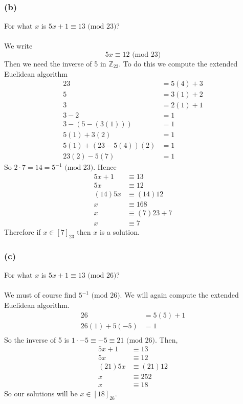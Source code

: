 \documentclass{article}
\begin{document}
\subsubsection*{(b)}
For what $x$ is $5x + 1 \equiv 13 \text{ (mod 23)}$?
\\\\
We write
\[ 5x \equiv 12 \text{ (mod 23)} \]
Then we need the inverse of 5 in $\mathbb{Z}_{23}$.
To do this we compute the extended Euclidean algorithm
\begin{align*}
    23 & = 5 (4)+ 3 \\
    5 & = 3 (1) + 2 \\
    3 & = 2 (1) + 1 \\
    3 - 2 & = 1 \\
    3 - (5 - (3 (1))) & = 1 \\
    5(1) + 3(2) & = 1 \\
    5(1) + (23 - 5(4))(2) & = 1 \\
    23(2) - 5(7) & = 1
\end{align*}
So $2 \cdot 7 = 14 = 5^{-1} \text{ (mod 23)}$.
Hence
\begin{align*}
    5x + 1 & \equiv 13 \\
    5x & \equiv 12 \\
    (14)5x & \equiv (14)12 \\
    x & \equiv 168 \\
    x & \equiv (7)23 + 7 \\
    x & \equiv 7
\end{align*}
Therefore if $x \in [7]_{23}$ then $x$ is a solution.
\subsubsection*{(c)}
For what $x$ is $5x +1 \equiv 13 \text{ (mod 26)}$?
\\\\
We must of course find $5^{-1} \text{ (mod 26)}$.
We will again compute the extended Euclidean algorithm.
\begin{align*}
    26 & = 5(5) + 1 \\
    26(1) + 5(-5) & = 1\\
\end{align*}
So the inverse of 5 is $1 \cdot -5 \equiv -5 \equiv 21 \text{ (mod 26)}$.
Then,
\begin{align*}
    5x + 1 &\equiv 13 \\
    5x & \equiv 12 \\
    (21)5x & \equiv (21)12 \\
    x & \equiv 252 \\
    x & \equiv 18
\end{align*}
So our solutions will be $x \in [18]_{26}$.
\end{document}
